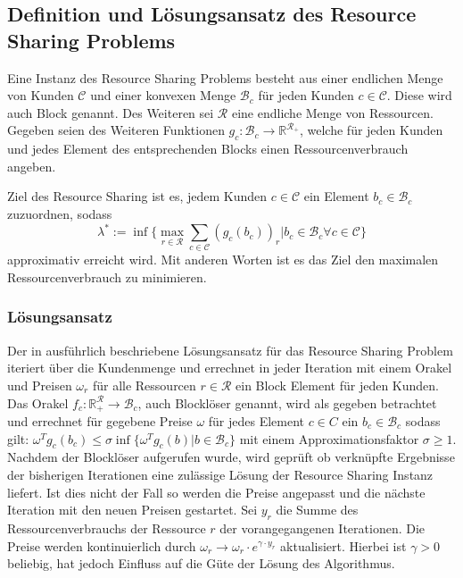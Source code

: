 \documentclass[11pt, a4paper, german]{article}
\begin{document}
\subsection{Definition und Lösungsansatz des Resource Sharing Problems}

Eine Instanz des Resource Sharing Problems besteht aus einer endlichen Menge von Kunden $\mathcal{C}$ und einer konvexen Menge $\mathcal{B}_c$ für jeden Kunden $c\in \mathcal{C}$. Diese wird auch Block genannt. Des Weiteren sei $\mathcal{R}$ eine endliche Menge von Ressourcen. Gegeben seien des Weiteren Funktionen $g_c : \mathcal{B}_ c \rightarrow \mathbb{R}^{\mathcal{R}_+}$, welche für jeden Kunden und jedes Element des entsprechenden Blocks einen Ressourcenverbrauch angeben.

Ziel des Resource Sharing ist es, jedem Kunden $c \in \mathcal{C}$ ein Element $b_c \in \mathcal{B}_c$ zuzuordnen, sodass 
\[ \lambda^* := \inf \{ \max\limits_{r \in \mathcal{R}} \sum\limits_{c \in \mathcal{C}}  (g_c(b_c))_r | b_c \in \mathcal{B}_c \forall c \in \mathcal{C} \} \]
approximativ erreicht wird. Mit anderen Worten ist es das Ziel den maximalen Ressourcenverbrauch zu minimieren. 

\subsubsection{Lösungsansatz}
\label{subsec:rs_loesungsansatz}
Der in \cite{Vygen2011} ausführlich beschriebene Lösungsansatz für das Resource Sharing Problem iteriert über die Kundenmenge und errechnet in jeder Iteration mit einem Orakel und Preisen $\omega _r$ für alle Ressourcen $r \in \mathcal{R}$ ein Block Element für jeden Kunden.\\
Das Orakel $f_c : \mathbb{R}^\mathcal{R}_+ \rightarrow \mathcal{B}_c$, auch Blocklöser genannt, wird als gegeben betrachtet und errechnet für gegebene Preise $\omega$ für jedes Element $c \in C$ ein $b_c \in \mathcal{B}_c$ sodass gilt: $ \omega ^T g_c(b_c) \leq \sigma \inf \{ \omega ^T g_c(b) | b \in \mathcal{B}_c \}$ mit einem Approximationsfaktor $\sigma \geq 1$.\\
Nachdem der Blocklöser aufgerufen wurde, wird geprüft ob verknüpfte Ergebnisse der bisherigen Iterationen eine zulässige Lösung der Resource Sharing Instanz liefert. Ist dies nicht der Fall so werden die Preise angepasst und die nächste Iteration mit den neuen Preisen gestartet. Sei $y_r$ die Summe des Ressourcenverbrauchs der Ressource $r$ der vorangegangenen Iterationen. Die Preise werden kontinuierlich durch $\omega _r \rightarrow \omega _r \cdot e^{\gamma \cdot y_r}$ aktualisiert. Hierbei ist $\gamma > 0 $ beliebig, hat jedoch Einfluss auf die Güte der Lösung des Algorithmus.\\
\end{document}
